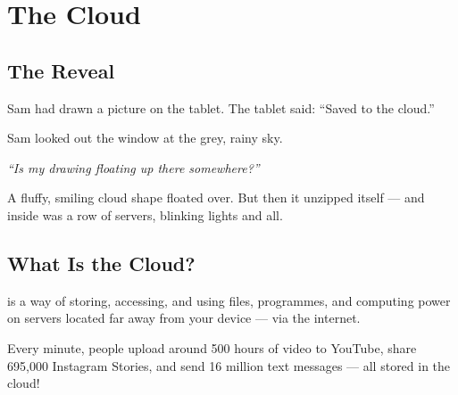 
\chapter{The Cloud}


\section*{The Reveal}

Sam had drawn a picture on the tablet.
The tablet said: ``Saved to the cloud.''

Sam looked out the window at the grey, rainy sky.

\begin{center}
  \Large\itshape\color{InternetBlue}
  ``Is my drawing floating up there somewhere?''
\end{center}

A fluffy, smiling cloud shape floated over.
But then it unzipped itself — and inside was a row of servers, blinking lights and all.


\sectionrule

\section*{What Is the Cloud?}

 is a way of storing, accessing, and using files, programmes, and computing power
on servers located far away from your device — via the internet.

\begin{funfact}
Every minute, people upload around 500 hours of video to YouTube, share 695,000 Instagram Stories, and send 16 million text messages — all stored in the cloud!
\end{funfact}

